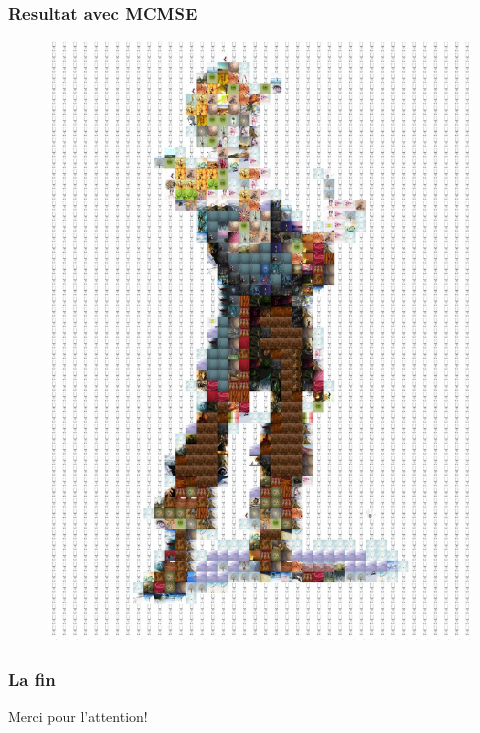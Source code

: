 \documentclass[handout]{beamer}
\begin{document}
\begin{frame}
\frametitle{\bf Resultat avec MCMSE}
\begin{figure}[H]
\includegraphics[scale=0.36]{guybrushmcmse.jpg}
\end{figure}
\end{frame}

\begin{frame}
\frametitle{\bf La fin}
Merci pour l'attention!
\end{frame}
%
%
\end{document}
